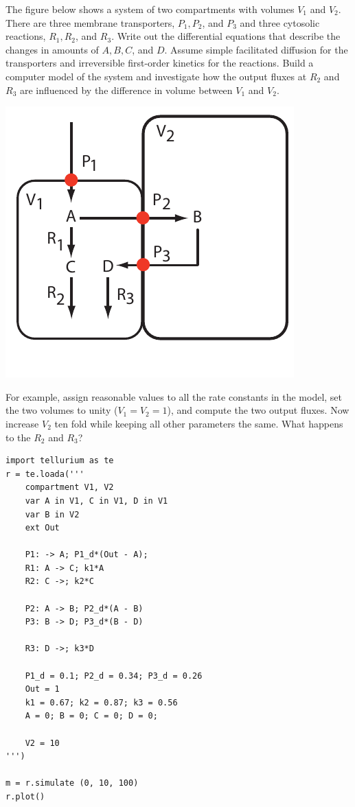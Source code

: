 \documentclass[12pt]{article}
\begin{document}
\begin{question}
The figure below shows a system of two compartments with volumes $V_1$ and $V_2$. There are three membrane transporters, $P_1, P_2$, and $P_3$ and three cytosolic reactions, $R_1, R_2$, and $R_3$. Write out the differential equations that describe the changes in amounts of $A, B, C$, and $D$. Assume simple facilitated diffusion for the transporters and irreversible first-order kinetics for the reactions. Build a computer model of the system and investigate how the output fluxes at $R_2$ and $R_3$ are influenced by the difference in volume between $V_1$ and $V_2$.

\begin{center}
  \includegraphics[scale = 0.9]{Compartment1}
\end{center}

    For example, assign reasonable values to all the rate constants in the model, set the two volumes to unity ($V_1 = V_2 = 1$), and compute the two output fluxes. Now increase $V_2$ ten fold while keeping all other parameters the same. What happens to the $R_2$ and $R_3$?

\end{question}
\cprotEnv\begin{solution}
\begin{verbatim}
import tellurium as te
r = te.loada('''
    compartment V1, V2
    var A in V1, C in V1, D in V1
    var B in V2
    ext Out

    P1: -> A; P1_d*(Out - A);
    R1: A -> C; k1*A
    R2: C ->; k2*C

    P2: A -> B; P2_d*(A - B)
    P3: B -> D; P3_d*(B - D)

    R3: D ->; k3*D

    P1_d = 0.1; P2_d = 0.34; P3_d = 0.26
    Out = 1
    k1 = 0.67; k2 = 0.87; k3 = 0.56
    A = 0; B = 0; C = 0; D = 0;

    V2 = 10
''')

m = r.simulate (0, 10, 100)
r.plot()
\end{verbatim}
\end{solution}
\end{document}
